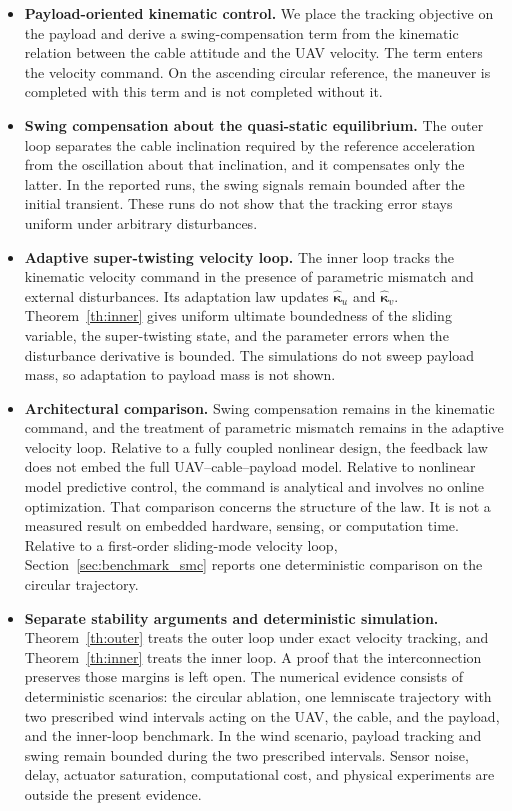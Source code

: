 \documentclass[sn-mathphys-num]{sn-jnl}
\theoremstyle{thmstyleone}%
\theoremstyle{thmstyletwo}%
\theoremstyle{thmstylethree}%
\begin{document}
\begin{itemize}

 \item \textbf{Payload-oriented kinematic control.} We place the tracking objective on the payload and derive a swing-compensation term from the kinematic relation between the cable attitude and the UAV velocity. The term enters the velocity command. On the ascending circular reference, the maneuver is completed with this term and is not completed without it.

 \item \textbf{Swing compensation about the quasi-static equilibrium.} The outer loop separates the cable inclination required by the reference acceleration from the oscillation about that inclination, and it compensates only the latter. In the reported runs, the swing signals remain bounded after the initial transient. These runs do not show that the tracking error stays uniform under arbitrary disturbances.

 \item \textbf{Adaptive super-twisting velocity loop.} The inner loop tracks the kinematic velocity command in the presence of parametric mismatch and external disturbances. Its adaptation law updates \(\hat{\boldsymbol{\kappa}}_u\) and \(\hat{\boldsymbol{\kappa}}_v\). Theorem~\ref{th:inner} gives uniform ultimate boundedness of the sliding variable, the super-twisting state, and the parameter errors when the disturbance derivative is bounded. The simulations do not sweep payload mass, so adaptation to payload mass is not shown.

 \item \textbf{Architectural comparison.} Swing compensation remains in the kinematic command, and the treatment of parametric mismatch remains in the adaptive velocity loop. Relative to a fully coupled nonlinear design, the feedback law does not embed the full UAV--cable--payload model. Relative to nonlinear model predictive control, the command is analytical and involves no online optimization. That comparison concerns the structure of the law. It is not a measured result on embedded hardware, sensing, or computation time. Relative to a first-order sliding-mode velocity loop, Section~\ref{sec:benchmark_smc} reports one deterministic comparison on the circular trajectory.

 \item \textbf{Separate stability arguments and deterministic simulation.} Theorem~\ref{th:outer} treats the outer loop under exact velocity tracking, and Theorem~\ref{th:inner} treats the inner loop. A proof that the interconnection preserves those margins is left open. The numerical evidence consists of deterministic scenarios: the circular ablation, one lemniscate trajectory with two prescribed wind intervals acting on the UAV, the cable, and the payload, and the inner-loop benchmark. In the wind scenario, payload tracking and swing remain bounded during the two prescribed intervals. Sensor noise, delay, actuator saturation, computational cost, and physical experiments are outside the present evidence.
\end{itemize}
\end{document}
